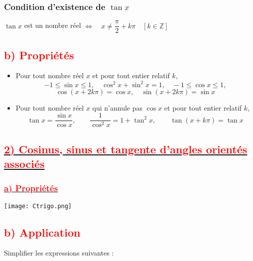 \documentclass[a4paper,12pt]{article}
\begin{document}
\subsubsection*{Condition d’existence de $\tan x$}

$\tan x$ est un nombre réel \quad $\Longleftrightarrow \quad x \neq \dfrac{\pi}{2} + k\pi \quad \left[ k \in \mathbb{Z} \right]$

\subsection*{\textcolor{red}{b) Propriétés}}

\begin{itemize}
    \item Pour tout nombre réel \( x \) et pour tout entier relatif \( k \),
          \[
              -1 \leq \sin x \leq 1, \quad \cos^2 x + \sin^2 x = 1, \quad -1 \leq \cos x \leq 1,
          \]
          \[
              \cos(x + 2k\pi) = \cos x, \quad \sin(x + 2k\pi) = \sin x
          \]

    \item Pour tout nombre réel \( x \) qui n’annule pas \( \cos x \) et pour tout entier relatif \( k \),
          \[
              \tan x = \dfrac{\sin x}{\cos x}, \qquad \dfrac{1}{\cos^2 x} = 1 + \tan^2 x, \qquad \tan(x + k\pi) = \tan x
          \]
\end{itemize}

\subsection*{\underline{\textcolor{red}{2) Cosinus, sinus et tangente d’angles orientés associés}}}

\subsubsection*{\underline{\textcolor{red}{a) Propriétés}}}

\begin{center}
    \texttt{[image: Ctrigo.png]} %
\end{center}

\subsection*{\textcolor{red}{b) Application}}

Simplifier les expressions suivantes :
\end{document}
